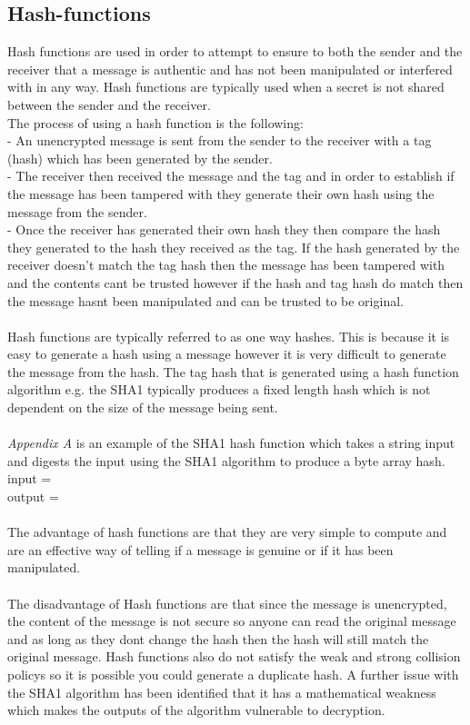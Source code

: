 \documentclass[a4paper, twoside, 11pt]{article}
\begin{document}
\subsection{Hash-functions}
Hash functions are used in order to attempt to ensure to both the sender and the receiver that a message is authentic and has not been manipulated or interfered with in any way. Hash functions are typically used when a secret is not shared between the sender and the receiver. 
\\
The process of using a hash function is the following:\\
- An unencrypted message is sent from the sender to the receiver with a tag (hash) which has been generated by the sender.\\
- The receiver then received the message and the tag and in order to establish if the message has been tampered with they generate their own hash using the message from the sender.\\
- Once the receiver has generated their own hash they then compare the hash they generated to the hash they received as the tag. If the hash generated by the receiver doesn't match the tag hash then the message has been tampered with and the contents cant be trusted however if the hash and tag hash do match then the message hasnt been manipulated and can be trusted to be original.\\
\\
Hash functions are typically referred to as one way hashes. This is because it is easy to generate a hash using a message however it is very difficult to generate the message from the hash. The tag hash that is generated using a hash function algorithm e.g. the SHA1 typically produces a fixed length hash which is not dependent on the size of the message being sent.\\
\\
\textit{Appendix A} is an example of the SHA1 hash function which takes a string input and digests the input using the SHA1 algorithm to produce a byte array hash. 
\\
input = \\
output = \\
\\
The advantage of hash functions are that they are very simple to compute and are an effective way of telling if a message is genuine or if it has been manipulated.\\
\\
The disadvantage of Hash functions are that since the message is unencrypted, the content of the message is not secure so anyone can read the original message and as long as they dont change the hash then the hash will still match the original message. Hash functions also do not satisfy the weak and strong collision policys so it is possible you could generate a duplicate hash. A further issue with the SHA1 algorithm has been identified that it has a mathematical weakness which makes the outputs of the algorithm vulnerable to decryption.
\end{document}
